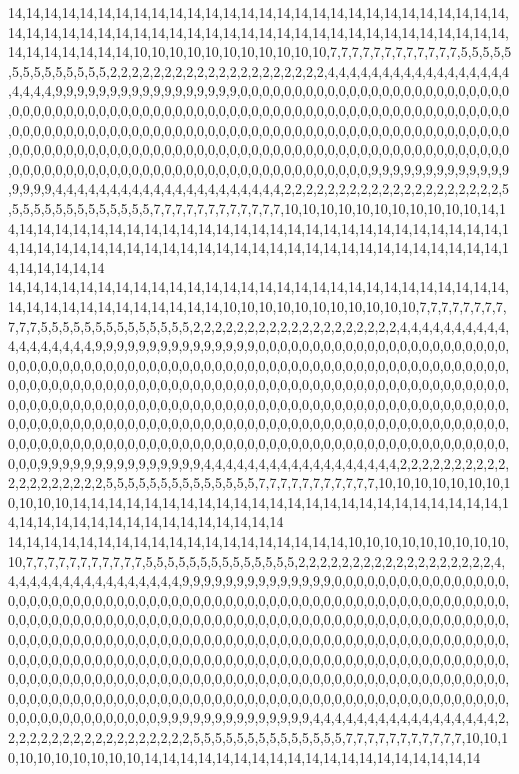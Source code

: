 14,14,14,14,14,14,14,14,14,14,14,14,14,14,14,14,14,14,14,14,14,14,14,14,14,14,14,14,14,14,14,14,14,14,14,14,14,14,14,14,14,14,14,14,14,14,14,14,14,14,14,14,14,14,14,14,14,14,14,14,14,14,14,10,10,10,10,10,10,10,10,10,10,10,7,7,7,7,7,7,7,7,7,7,7,7,5,5,5,5,5,5,5,5,5,5,5,5,5,5,2,2,2,2,2,2,2,2,2,2,2,2,2,2,2,2,2,2,2,2,4,4,4,4,4,4,4,4,4,4,4,4,4,4,4,4,4,4,4,4,4,9,9,9,9,9,9,9,9,9,9,9,9,9,9,9,9,9,0,0,0,0,0,0,0,0,0,0,0,0,0,0,0,0,0,0,0,0,0,0,0,0,0,0,0,0,0,0,0,0,0,0,0,0,0,0,0,0,0,0,0,0,0,0,0,0,0,0,0,0,0,0,0,0,0,0,0,0,0,0,0,0,0,0,0,0,0,0,0,0,0,0,0,0,0,0,0,0,0,0,0,0,0,0,0,0,0,0,0,0,0,0,0,0,0,0,0,0,0,0,0,0,0,0,0,0,0,0,0,0,0,0,0,0,0,0,0,0,0,0,0,0,0,0,0,0,0,0,0,0,0,0,0,0,0,0,0,0,0,0,0,0,0,0,0,0,0,0,0,0,0,0,0,0,0,0,0,0,0,0,0,0,0,0,0,0,0,0,0,0,0,0,0,0,0,0,0,0,0,0,0,0,0,0,0,0,0,0,0,0,0,0,0,0,9,9,9,9,9,9,9,9,9,9,9,9,9,9,9,9,9,4,4,4,4,4,4,4,4,4,4,4,4,4,4,4,4,4,4,4,4,4,2,2,2,2,2,2,2,2,2,2,2,2,2,2,2,2,2,2,2,2,5,5,5,5,5,5,5,5,5,5,5,5,5,5,7,7,7,7,7,7,7,7,7,7,7,7,10,10,10,10,10,10,10,10,10,10,10,14,14,14,14,14,14,14,14,14,14,14,14,14,14,14,14,14,14,14,14,14,14,14,14,14,14,14,14,14,14,14,14,14,14,14,14,14,14,14,14,14,14,14,14,14,14,14,14,14,14,14,14,14,14,14,14,14,14,14,14,14,14,14
14,14,14,14,14,14,14,14,14,14,14,14,14,14,14,14,14,14,14,14,14,14,14,14,14,14,14,14,14,14,14,14,14,14,14,14,14,14,14,14,10,10,10,10,10,10,10,10,10,10,10,7,7,7,7,7,7,7,7,7,7,7,5,5,5,5,5,5,5,5,5,5,5,5,5,5,2,2,2,2,2,2,2,2,2,2,2,2,2,2,2,2,2,2,2,4,4,4,4,4,4,4,4,4,4,4,4,4,4,4,4,4,4,9,9,9,9,9,9,9,9,9,9,9,9,9,9,9,0,0,0,0,0,0,0,0,0,0,0,0,0,0,0,0,0,0,0,0,0,0,0,0,0,0,0,0,0,0,0,0,0,0,0,0,0,0,0,0,0,0,0,0,0,0,0,0,0,0,0,0,0,0,0,0,0,0,0,0,0,0,0,0,0,0,0,0,0,0,0,0,0,0,0,0,0,0,0,0,0,0,0,0,0,0,0,0,0,0,0,0,0,0,0,0,0,0,0,0,0,0,0,0,0,0,0,0,0,0,0,0,0,0,0,0,0,0,0,0,0,0,0,0,0,0,0,0,0,0,0,0,0,0,0,0,0,0,0,0,0,0,0,0,0,0,0,0,0,0,0,0,0,0,0,0,0,0,0,0,0,0,0,0,0,0,0,0,0,0,0,0,0,0,0,0,0,0,0,0,0,0,0,0,0,0,0,0,0,0,0,0,0,0,0,0,0,0,0,0,0,0,0,0,0,0,0,0,0,0,0,0,0,0,0,0,0,0,0,0,0,0,0,0,0,0,0,0,0,0,0,0,0,0,0,0,0,0,0,0,0,0,0,0,0,0,0,0,0,0,0,0,0,0,0,0,9,9,9,9,9,9,9,9,9,9,9,9,9,9,9,4,4,4,4,4,4,4,4,4,4,4,4,4,4,4,4,4,4,2,2,2,2,2,2,2,2,2,2,2,2,2,2,2,2,2,2,2,5,5,5,5,5,5,5,5,5,5,5,5,5,5,7,7,7,7,7,7,7,7,7,7,7,10,10,10,10,10,10,10,10,10,10,10,14,14,14,14,14,14,14,14,14,14,14,14,14,14,14,14,14,14,14,14,14,14,14,14,14,14,14,14,14,14,14,14,14,14,14,14,14,14,14,14
14,14,14,14,14,14,14,14,14,14,14,14,14,14,14,14,14,14,14,10,10,10,10,10,10,10,10,10,10,7,7,7,7,7,7,7,7,7,7,7,5,5,5,5,5,5,5,5,5,5,5,5,5,5,2,2,2,2,2,2,2,2,2,2,2,2,2,2,2,2,2,2,4,4,4,4,4,4,4,4,4,4,4,4,4,4,4,4,4,9,9,9,9,9,9,9,9,9,9,9,9,9,9,0,0,0,0,0,0,0,0,0,0,0,0,0,0,0,0,0,0,0,0,0,0,0,0,0,0,0,0,0,0,0,0,0,0,0,0,0,0,0,0,0,0,0,0,0,0,0,0,0,0,0,0,0,0,0,0,0,0,0,0,0,0,0,0,0,0,0,0,0,0,0,0,0,0,0,0,0,0,0,0,0,0,0,0,0,0,0,0,0,0,0,0,0,0,0,0,0,0,0,0,0,0,0,0,0,0,0,0,0,0,0,0,0,0,0,0,0,0,0,0,0,0,0,0,0,0,0,0,0,0,0,0,0,0,0,0,0,0,0,0,0,0,0,0,0,0,0,0,0,0,0,0,0,0,0,0,0,0,0,0,0,0,0,0,0,0,0,0,0,0,0,0,0,0,0,0,0,0,0,0,0,0,0,0,0,0,0,0,0,0,0,0,0,0,0,0,0,0,0,0,0,0,0,0,0,0,0,0,0,0,0,0,0,0,0,0,0,0,0,0,0,0,0,0,0,0,0,0,0,0,0,0,0,0,0,0,0,0,0,0,0,0,0,0,0,0,0,0,0,0,0,0,0,0,0,0,0,0,0,0,0,0,0,0,0,0,0,0,0,0,0,0,0,0,0,0,0,0,0,0,0,0,0,0,0,0,0,0,0,0,0,0,0,0,0,0,0,0,0,0,0,0,0,0,0,0,9,9,9,9,9,9,9,9,9,9,9,9,9,9,4,4,4,4,4,4,4,4,4,4,4,4,4,4,4,4,4,2,2,2,2,2,2,2,2,2,2,2,2,2,2,2,2,2,2,5,5,5,5,5,5,5,5,5,5,5,5,5,5,7,7,7,7,7,7,7,7,7,7,7,10,10,10,10,10,10,10,10,10,10,14,14,14,14,14,14,14,14,14,14,14,14,14,14,14,14,14,14,14
